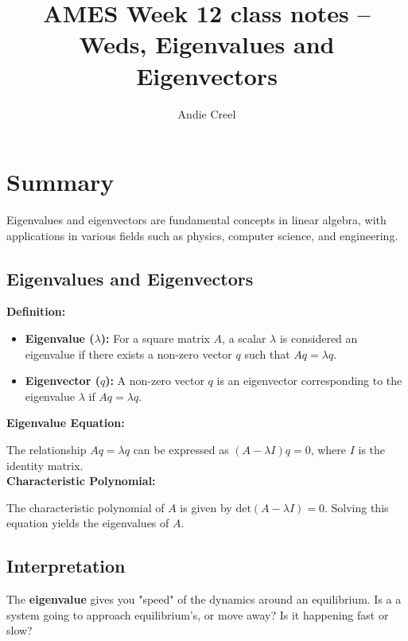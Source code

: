 \documentclass{article}
\title{AMES Week 12 class notes -- Weds, Eigenvalues and Eigenvectors }
\author{Andie Creel}
\begin{document}
\maketitle

\section{Summary}

Eigenvalues and eigenvectors are fundamental concepts in linear algebra, with applications in various fields such as physics, computer science, and engineering.

\subsection{Eigenvalues and Eigenvectors}

\textbf{Definition:}

\begin{itemize}
  \item \textbf{Eigenvalue (\(\lambda\)):} For a square matrix \(A\), a scalar \(\lambda\) is considered an eigenvalue if there exists a non-zero vector \(q\) such that \(Aq = \lambda q\).
  
  \item \textbf{Eigenvector (\(q\)):} A non-zero vector \(q\) is an eigenvector corresponding to the eigenvalue \(\lambda\) if \(Aq = \lambda q\).
\end{itemize}

\textbf{Eigenvalue Equation:}

The relationship \(Aq = \lambda q\) can be expressed as \((A - \lambda I) q = 0\), where \(I\) is the identity matrix.\\

\textbf{Characteristic Polynomial:}

The characteristic polynomial of \(A\) is given by \(\text{det}(A - \lambda I) = 0\). Solving this equation yields the eigenvalues of \(A\).

\subsection{Interpretation}

The \textbf{eigenvalue} gives you "speed" of the dynamics around an equilibrium. Is a a system going to approach equilibrium's, or move away? Is it happening fast or slow?\\
\end{document}
